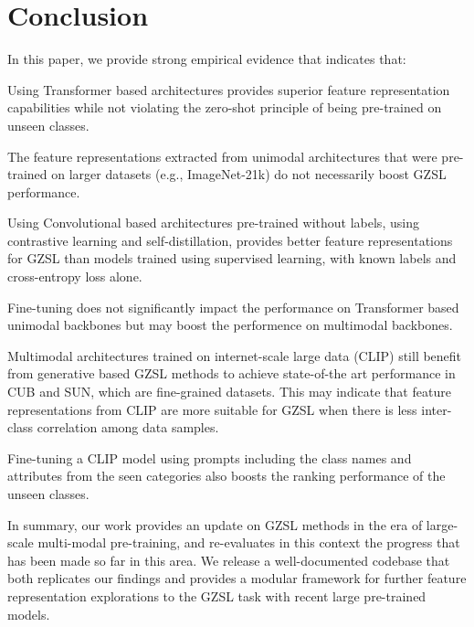 \section{Conclusion}

In this paper, we provide strong empirical evidence that indicates that:

\begin{compactitem}
\item Using Transformer based architectures provides superior feature representation capabilities while not violating the zero-shot principle of being pre-trained on unseen classes.

\item The feature representations extracted from unimodal architectures that were pre-trained on larger datasets (e.g., ImageNet-21k) do not necessarily boost GZSL performance.

\item Using Convolutional based architectures pre-trained without labels, using contrastive learning and self-distillation, provides better feature representations for GZSL than models trained using supervised learning, with known labels and cross-entropy loss alone.

\item Fine-tuning does not significantly impact the performance on Transformer based unimodal backbones but may boost the performence on multimodal backbones.

\item Multimodal architectures trained on internet-scale large data (CLIP) still benefit from generative based GZSL methods to achieve state-of-the art performance in CUB and SUN, which are fine-grained datasets. This may indicate that feature representations from CLIP are more suitable for GZSL when there is less inter-class correlation among data samples.

\item Fine-tuning a CLIP model using prompts including the class names and attributes 
from the seen categories also boosts the ranking performance of the unseen classes.
\end{compactitem}

In summary, our work provides an update on GZSL methods in the era of large-scale multi-modal pre-training, and re-evaluates in this context the progress that has been made so far in this area.
We release a well-documented codebase that both replicates our findings and provides a modular framework for further feature representation explorations to the GZSL task with recent large pre-trained models.